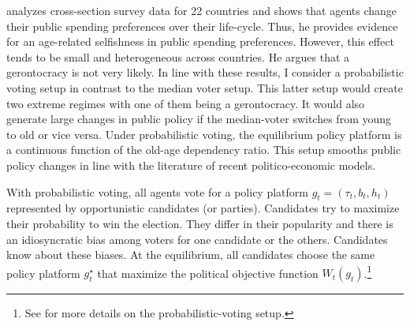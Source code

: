 \cite{Sorensen2013} analyzes cross-section survey data for 22 countries and shows that agents change their public spending preferences over their life-cycle. Thus, he provides evidence for an age-related selfishness in public spending preferences. However, this effect tends to be small and heterogeneous across countries. He argues that a gerontocracy is not very likely. In line with these results, I consider a probabilistic voting setup in contrast to the median voter setup. This latter setup would create two extreme regimes with one of them being a gerontocracy. It would also generate large changes in public policy if the median-voter switches from young to old or vice versa. Under probabilistic voting, the equilibrium policy platform is a continuous function of the old-age dependency ratio. This setup smooths public policy changes in line with the literature of recent politico-economic models.

With probabilistic voting, all agents vote for a policy platform $g_t = (\tau_t, b_t, h_t)$ represented by opportunistic candidates (or parties). Candidates try to maximize their probability to win the election. They differ in their popularity and there is an idiosyncratic bias among voters for one candidate or the others. Candidates know about these biases. At the equilibrium, all candidates choose the same policy platform $g_t^\star$ that maximize the political objective function $W_t(g_t)$.\footnote{See \cite{Lindbeck1987} for more details on the probabilistic-voting setup.}

